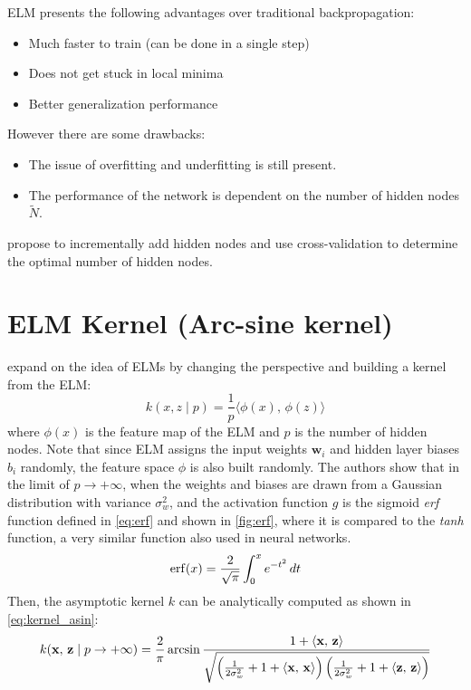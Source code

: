 ELM presents the following advantages over traditional backpropagation:
\begin{itemize}
    \item Much faster to train (can be done in a single step)
    \item Does not get stuck in local minima
    \item Better generalization performance
\end{itemize}
However there are some drawbacks:
\begin{itemize}
    \item The issue of overfitting and underfitting is still present.
    \item The performance of the network is dependent on the number of hidden nodes $\tilde{N}$.
\end{itemize}
\Textcite{huangExtremeLearningMachine2012} propose to incrementally add hidden
nodes and use cross-validation to determine the optimal number of hidden nodes.

\section{ELM Kernel (Arc-sine kernel)}%

\Textcite{frenayParameterinsensitiveKernelExtreme2011} expand on the idea of
ELMs \cite{huangExtremeLearningMachine2006,huangExtremeLearningMachine2012} by
changing the perspective and building a kernel from the ELM:
\begin{equation}
    k(x, z \mid p) = \frac{1}{p}\bigl\langle \phi(x),\,\phi(z) \bigr\rangle
\end{equation}
where $\phi(x)$ is the feature map of the ELM and $p$ is the number of hidden
nodes. Note that since ELM assigns the input weights $\textbf{w}_i$ and hidden
layer biases $b_i$ randomly, the feature space $\phi$ is also built randomly.
The authors show that in the limit of $p \to +\infty$, when the weights and
biases are drawn from a Gaussian distribution with variance $\sigma_w^2$, and
the activation function $g$ is the sigmoid \emph{erf} function defined in
\cref{eq:erf} and shown in \cref{fig:erf}, where it is compared to the
\emph{tanh} function, a very similar function also used in neural networks.
\begin{equation}\label{eq:erf}
    \operatorname{erf}(x) = \frac{2}{\sqrt{\pi}} \int_0^x e^{-t^2} \,dt
\end{equation}
Then, the asymptotic kernel $k$ can be analytically computed as shown in
\cref{eq:kernel_asin}:
\begin{equation}\label{eq:kernel_asin}
    k(\mathbf{x},\,\mathbf{z} \mid p \to + \infty)  = \frac{2}{\pi}
    \arcsin \frac{1 + \left\langle \mathbf{x},\,\mathbf{z} \right\rangle}{\sqrt{
            \left(
            \frac{1}{2\sigma_w^2} + 1 + \left\langle \mathbf{x},\,\mathbf{x} \right\rangle
            \right)
            \left(
            \frac{1}{2\sigma_w^2} + 1 + \left\langle \mathbf{z},\,\mathbf{z} \right\rangle
            \right)
        }}
\end{equation}


